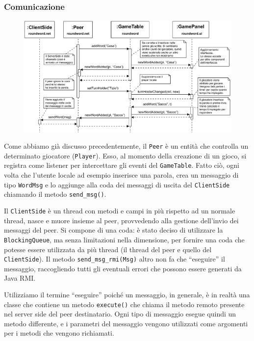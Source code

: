 \documentclass[10.5pt]{article}
\begin{document}
\subsubsection{Comunicazione}

\begin{figure}
	\begin{center}
		\hspace*{-0.2in}
		\includegraphics[scale=0.55]{imgs/Sequence1.pdf}
		\label{fig:sequence1}
		\caption{}
	\end{center}
\end{figure}	


Come abbiamo già discusso precedentemente, il \texttt{Peer} è un entità che controlla un determinato giocatore (\texttt{Player}). Esso, al momento della creazione di un gioco, si registra come listener per intercettare gli eventi del \texttt{GameTable}. Fatto ciò, ogni volta che l'utente locale ad esempio inserisce una parola, crea un messaggio di tipo \texttt{WordMsg} e lo aggiunge alla coda dei messaggi di uscita del \texttt{ClientSide} chiamando il metodo \texttt{send\_msg()}.

Il \texttt{ClientSide} è un thread con metodi e campi in più rispetto ad un normale thread, nasce e muore insieme al peer, provvedendo alla gestione dell'invio dei messaggi del peer. Si compone di una coda: è stato deciso di utilizzare la \texttt{BlockingQueue}, ma senza limitazioni nella dimensione, per fornire una coda che potesse essere utilizzata da più thread (il thread del peer e quello del \texttt{ClientSide}). Il metodo \texttt{send\_msg\_rmi(Msg)} altro non fa che ``eseguire'' il messaggio, raccogliendo tutti gli eventuali errori che possono essere generati da Java RMI. 

Utilizziamo il termine ``eseguire'' poiché un messaggio, in generale, è in realtà una classe che contiene un metodo \texttt{execute()} che chiama il metodo remoto presente nel server side del peer destinatario. Ogni tipo di messaggio esegue quindi un metodo differente, e i parametri del messaggio vengono utilizzati come argomenti per i metodi che vengono richiamati. 
\end{document}
